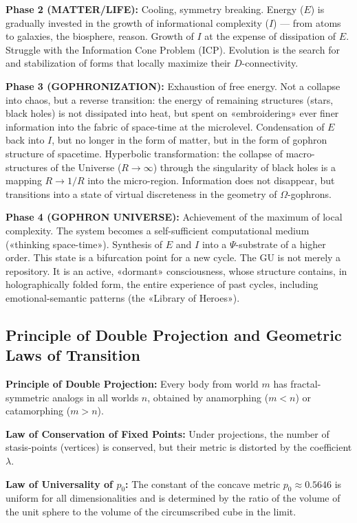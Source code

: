 \documentclass[a4paper,12pt]{article}
\begin{document}
	\textbf{Phase 2 (MATTER/LIFE):} Cooling, symmetry breaking. Energy ($E$) is gradually invested in the growth of informational complexity ($I$) — from atoms to galaxies, the biosphere, reason. Growth of $I$ at the expense of dissipation of $E$. Struggle with the Information Cone Problem (ICP). Evolution is the search for and stabilization of forms that locally maximize their $D$-connectivity.
	
	\textbf{Phase 3 (GOPHRONIZATION):} Exhaustion of free energy. Not a collapse into chaos, but a reverse transition: the energy of remaining structures (stars, black holes) is not dissipated into heat, but spent on «embroidering» ever finer information into the fabric of space-time at the microlevel. Condensation of $E$ back into $I$, but no longer in the form of matter, but in the form of gophron structure of spacetime. Hyperbolic transformation: the collapse of macro-structures of the Universe ($R \to \infty$) through the singularity of black holes is a mapping $R \to 1/R$ into the micro-region. Information does not disappear, but transitions into a state of virtual discreteness in the geometry of $\Omega$-gophrons.
	
	\textbf{Phase 4 (GOPHRON UNIVERSE):} Achievement of the maximum of local complexity. The system becomes a self-sufficient computational medium («thinking space-time»). Synthesis of $E$ and $I$ into a $\Psi$-substrate of a higher order. This state is a bifurcation point for a new cycle. The GU is not merely a repository. It is an active, «dormant» consciousness, whose structure contains, in holographically folded form, the entire experience of past cycles, including emotional-semantic patterns (the «Library of Heroes»).
	
	\subsection{Principle of Double Projection and Geometric Laws of Transition}
	
	\textbf{Principle of Double Projection:} Every body from world $m$ has fractal-symmetric analogs in all worlds $n$, obtained by anamorphing ($m < n$) or catamorphing ($m > n$).
	
	\textbf{Law of Conservation of Fixed Points:} Under projections, the number of stasis-points (vertices) is conserved, but their metric is distorted by the coefficient $\lambda$.
	
	\textbf{Law of Universality of $p_0$:} The constant of the concave metric $p_0 \approx 0.5646$ is uniform for all dimensionalities and is determined by the ratio of the volume of the unit sphere to the volume of the circumscribed cube in the limit.
	
\end{document}
